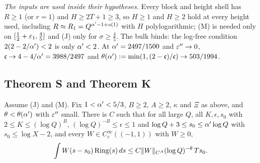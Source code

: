 \emph{The inputs are used inside their hypotheses.} Every block and height shell has $R\ge1$ (or $r=1$) and $H\ge2T+1\ge3$, so $H\ge1$ and $H\ge2$ hold at every
height used, including $R\approx R_1=Q^{\alpha'-1+o(1)}$ with $H$ polylogarithmic; (M) is needed only on $[\frac12+\varepsilon_1,\frac45]$ and (J) only for $\sigma\ge\frac45$. The
bulk binds: the log-free condition $2(2-2/\alpha')<2$ is only $\alpha'<2$. At $\alpha'=2497/1500$ and $\varepsilon''\to0$, $\mathfrak c\to4-4/\alpha'=3988/2497$ and
$\theta(\alpha'):=\min(1,(2-\mathfrak c)/\mathfrak c)\to503/1994$.

\subsection{Theorem S and Theorem K}\label{ssec:shell-S}
\begin{theorem}\label{thm:shell-S}
Assume \textup{(J)} and \textup{(M)}. Fix $1<\alpha'<5/3$, $B\ge2$, $A\ge2$, $\kappa$ and $\Xi$ as above, and $\theta<\theta(\alpha')$ with $\varepsilon''$ small. There is $C$ such that
for all large $Q$, all $K,\epsilon,s_0$ with $2\le K\le(\log Q)^B$, $(\log Q)^{-B}\le\epsilon\le1$ and $\log Q+3\le s_0\le\alpha'\log Q$ with $s_0\le\log X-2$, and every $W\in C_c^\infty((-1,1))$ with
$W\ge0$,
\[
\int W(s-s_0)\,\mathrm{Ring}(s)\,ds\le C\lVert W\rVert_{C^A}(\log Q)^{-\theta}\,T s_0 .
\]
\end{theorem}
